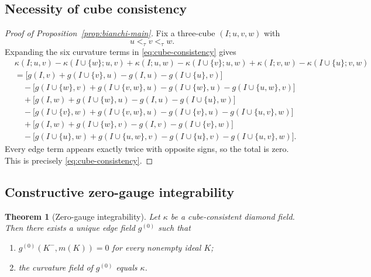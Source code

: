 \documentclass{article}
\newtheorem{theorem}{Theorem}[section]
\theoremstyle{definition}
\begin{document}
\subsection{Necessity of cube consistency}

\begin{proof}[Proof of Proposition~\ref{prop:bianchi-main}]
Fix a three-cube \((I;u,v,w)\) with
\[
u<_{\tau}v<_{\tau}w.
\]
Expanding the six curvature terms in \eqref{eq:cube-consistency} gives
\begin{align*}
&\kappa(I;u,v)
-\kappa(I\cup\{w\};u,v)
+\kappa(I;u,w)
-\kappa(I\cup\{v\};u,w)
+\kappa(I;v,w)
-\kappa(I\cup\{u\};v,w)\\
&=
\bigl[g(I,v)+g(I\cup\{v\},u)-g(I,u)-g(I\cup\{u\},v)\bigr]\\
&\quad
-\bigl[g(I\cup\{w\},v)+g(I\cup\{v,w\},u)-g(I\cup\{w\},u)-g(I\cup\{u,w\},v)\bigr]\\
&\quad
+\bigl[g(I,w)+g(I\cup\{w\},u)-g(I,u)-g(I\cup\{u\},w)\bigr]\\
&\quad
-\bigl[g(I\cup\{v\},w)+g(I\cup\{v,w\},u)-g(I\cup\{v\},u)-g(I\cup\{u,v\},w)\bigr]\\
&\quad
+\bigl[g(I,w)+g(I\cup\{w\},v)-g(I,v)-g(I\cup\{v\},w)\bigr]\\
&\quad
-\bigl[g(I\cup\{u\},w)+g(I\cup\{u,w\},v)-g(I\cup\{u\},v)-g(I\cup\{u,v\},w)\bigr].
\end{align*}
Every edge term appears exactly twice with opposite signs, so the total is zero. This is precisely \eqref{eq:cube-consistency}.
\end{proof}

\subsection{Constructive zero-gauge integrability}

\begin{theorem}[Zero-gauge integrability]
\label{thm:zero-gauge-app}
Let \(\kappa\) be a cube-consistent diamond field. Then there exists a unique edge field \(g^{(0)}\) such that
\begin{enumerate}
    \item \(g^{(0)}(K^-,m(K))=0\) for every nonempty ideal \(K\);
    \item the curvature field of \(g^{(0)}\) equals \(\kappa\).
\end{enumerate}
\end{theorem}
\end{document}
